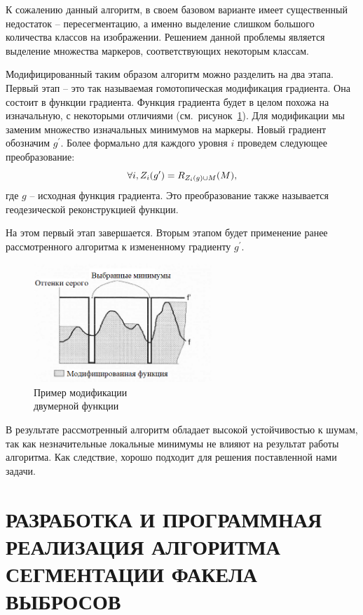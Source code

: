 \documentclass[14pt, a4paper]{extreport}
\begin{document}
	К сожалению данный алгоритм, в своем базовом варианте имеет существенный недостаток -- пересегментацию, а именно выделение слишком большого количества классов на изображении. Решением данной проблемы является выделение множества маркеров, соответствующих некоторым классам.
	
	Модифицированный таким образом алгоритм можно разделить на два этапа. Первый этап -- это так называемая гомотопическая модификация градиента. Она состоит в функции градиента. Функция градиента будет в целом похожа на изначальную, с некоторыми отличиями (см.~рисунок~\ref{fig:Watershed_markers_modification}). Для модификации мы заменим множество изначальных минимумов на маркеры. Новый градиент обозначим $g^\prime$. Более формально для каждого уровня $i$ проведем следующее преобразование:\vspace*{-0.3cm}
	\begin{equation*}
		\forall i, Z_i(g^\prime)=R_{Z_i(g)\cup M}(M),
		\vspace*{-0.3cm}
		\label{IZ_X(Y)}
	\end{equation*}
	где $g$ -- исходная функция градиента. Это преобразование также называется геодезической реконструкцией функции.
	
	На этом первый этап завершается. Вторым этапом будет применение ранее рассмотренного алгоритма к измененному градиенту $g^\prime$.
	\begin{figure}[h!]
		\centering
		\includegraphics[width = 0.6\textwidth]{image/chapter_2/Watershed_markers_modification}	
		\caption{Пример модификации \\двумерной функции}
		\label{fig:Watershed_markers_modification}
	\end{figure}
	
	В результате рассмотренный алгоритм обладает высокой устойчивостью к шумам, так как незначительные локальные минимумы не влияют на результат работы алгоритма. Как следствие, хорошо подходит для решения поставленной нами задачи.
	
	
	\chapter[\vspace*{-0.22cm}РАЗРАБОТКА И ПРОГРАММНАЯ РЕАЛИЗАЦИЯ АЛГОРИТМА \hspace*{-0.5cm} СЕГМЕНТАЦИИ ФАКЕЛА ВЫБРОСОВ]{\vspace*{-0.22cm}РАЗРАБОТКА И ПРОГРАММНАЯ РЕАЛИЗАЦИЯ АЛГОРИТМА СЕГМЕНТАЦИИ ФАКЕЛА ВЫБРОСОВ}
\end{document}
